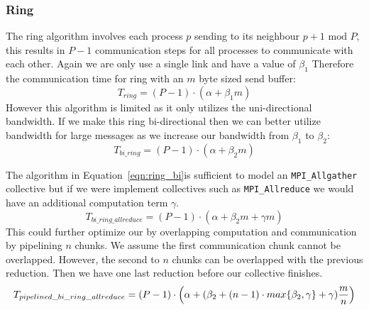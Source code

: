 \documentclass{article}
\begin{document}
  \subsubsection{Ring}
  The ring algorithm involves each process $p$ sending to its neighbour $p + 1 \text{~mod~} P$,
  this results in $P - 1$ communication steps for all processes to communicate with each other.
  Again we are only use a single link and have a value of $\beta_1$
  Therefore the communication time for ring with an $m$ byte sized send buffer:
  \begin{equation}
    \label{eqn:ring}
    T_{ring} = (P - 1) \cdot (\alpha + \beta_1 m)
  \end{equation}
  \noindent
  However this algorithm is limited as it only utilizes the uni-directional bandwidth.
  If we make this ring bi-directional then we can better utilize bandwidth for large messages
  as we increase our bandwidth from $\beta_1$ to $\beta_2$:
  \begin{equation}
    \label{eqn:ring_bi}
    T_{bi\_ring} = (P - 1) \cdot (\alpha + \beta_2 m)
  \end{equation}

  The algorithm in Equation~\ref{eqn:ring_bi}is sufficient to model an
  \texttt{MPI\_Allgather} collective but
  if we were implement collectives such as \texttt{MPI\_Allreduce} we would have an additional
  computation term $\gamma$.
  \begin{equation}
    T_{bi\_ring\_allreduce}
      = (P - 1) \cdot (\alpha + \beta_2 m + \gamma m)
  \end{equation}
  \noindent
  This could further optimize our by overlapping computation and communication by pipelining $n$
  chunks.
  We assume the first communication chunk cannot be overlapped.
  However,
  the second to $n$ chunks can be overlapped with the previous reduction.
  Then we have one last reduction before our collective finishes.
  \begin{equation}
    T_{pipelined\_bi\_ring\_allreduce}
      = (P - 1) \cdot \Bigl(\alpha +
                            (\beta_2 + (n - 1) \cdot max\{\beta_2, \gamma\} + \gamma)\frac{m}{n}
                      \Bigr)
  \end{equation}

\end{document}
